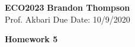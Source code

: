 \noindent
\textbf{ECO2023} \hfill \textbf{Brandon Thompson} \\
\normalsize Prof. Akbari \hfill Due Date: 10/9/2020 \\

\begin{center}
\textbf{Homework 5}
\end{center}